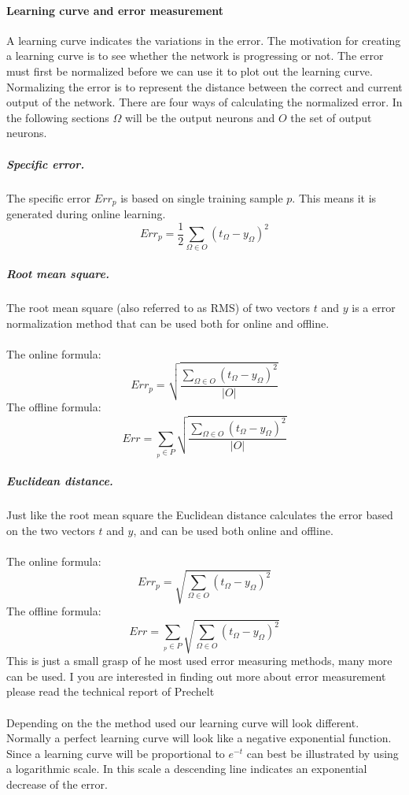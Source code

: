 \documentclass[pdftex,a4paper,12pt,twoside]{report}
\theoremstyle{plain} \newtheorem{theorem}{Theorem} \newtheorem{proposition}{Proposition} \newtheorem{lemma}{Lemma} \newtheorem*{corollary}{Corollary}
\theoremstyle{definition} \newtheorem{definition}{Definition} \newtheorem{conjecture}{Conjecture} \newtheorem*{example}{Example} \newtheorem{algorithm}{Algorithm}
\theoremstyle{remark} \newtheorem*{remark}{Remark} \newtheorem*{note}{Note} \newtheorem{case}{Case}
\begin{document}
\paragraph{Learning curve and error measurement}
A learning curve indicates the variations in the error. The motivation for creating a learning curve is to see whether the network is progressing or not. The error must first be normalized before we can use it to plot out the learning curve. Normalizing the error is to represent the distance between the correct and current output of the network. There are four ways of calculating the normalized error. In the following sections $\Omega$ will be the output neurons and $O$ the set of output neurons.
\subparagraph{Specific error.}
The specific error $Err_p$ is based on single training sample $p$. This means it is generated during online learning.
\begin{equation}
Err_p = \frac{1}{2} \sum_{\Omega \in O}(t_\Omega - y_\Omega)^2
\end{equation}
\subparagraph{Root mean square.}
The root mean square (also referred to as RMS) of two vectors $t$ and $y$ is a error normalization method that can be used both for online and offline.\\\\
The online formula:
\begin{equation}
Err_p =  \sqrt{\frac{\sum_{\Omega \in O}(t_\Omega - y_\Omega)^2}{|O|}}
\end{equation}
The offline formula:
\begin{equation}
Err = \sum_{_{p} \in P}\sqrt{\frac{\sum_{\Omega \in O}(t_\Omega - y_\Omega)^2}{|O|}}
\end{equation}
\subparagraph{Euclidean distance.}
Just like the root mean square the Euclidean distance calculates the error based on the two vectors $t$ and $y$, and can be used both online and offline.\\\\
The online formula:
\begin{equation}
Err_p =  \sqrt{{\sum_{\Omega \in O}(t_\Omega - y_\Omega)^2}}
\end{equation}
The offline formula:
\begin{equation}
Err = \sum_{_{p} \in P}\sqrt{{\sum_{\Omega \in O}(t_\Omega - y_\Omega)^2}}
\end{equation}
This is just a small grasp of he most used error measuring methods, many more can be used. I you are interested in finding out more about error measurement please read the technical report of Prechelt \citep{Prechelt1994}\\\\Depending on the the method used our learning curve will look different. Normally a perfect learning curve will look like a negative exponential function. Since a learning curve will be proportional to $e^{-t}$ can best be illustrated by using a logarithmic scale. In this scale a descending line indicates an exponential decrease of the error.
\end{document}
